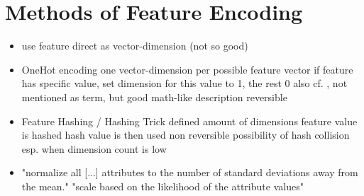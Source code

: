 \section{Methods of Feature Encoding}
\begin{itemize}
	\item use feature direct as vector-dimension (not so good)
	\item OneHot encoding
		\subitem one vector-dimension per possible feature vector
		\subitem if feature has specific value, set dimension for this value to 1, the rest 0
		\subitem also cf. \textcite[][p. 12]{Eskin2002}, not mentioned as term, but good math-like description
		\subitem reversible
	\item Feature Hashing / Hashing Trick
		\subitem defined amount of dimensions
		\subitem feature value is hashed
		\subitem hash value is then used
		\subitem non reversible
		\subitem possibility of hash collision
		\subitem esp. when dimension count is low
	\item "normalize all [...] attributes to the number of standard deviations away from the mean." \parencite{Eskin2002}
		\subitem "scale based on the likelihood of the attribute values" \parencite{Eskin2002}
		
\end{itemize}